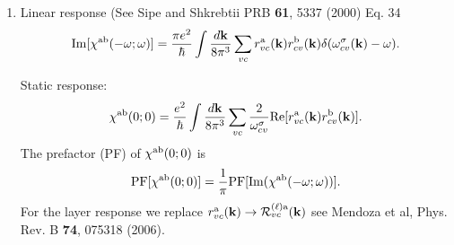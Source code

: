 \documentclass[12pt]{article}
\numberwithin{equation}{section}
\begin{document}
\begin{enumerate}

\item Linear response (See Sipe and Shkrebtii PRB {\bf 61}, 5337 (2000) Eq. 34 \cite{sipePRB00}
\begin{equation}\label{chif}
\mathrm{Im}[\chi^{\mathrm{a}\mathrm{b}}(-\omega;\omega)]
=\frac{\pi e^2}{\hbar}
\int \frac{d\mathbf{k}}{8\pi^3}
\sum_{vc} 
r^{\mathrm{a}}_{vc}(\mathbf{k})r^{\mathrm{b}}_{cv}(\mathbf{k})\delta(\omega^\sigma_{cv}(\mathbf{k})-\omega)  
.  
\end{equation}  

Static response:
\begin{equation*}\label{chif0}
\chi^{\mathrm{a}\mathrm{b}}(0;0)=\frac{e^2}{\hbar}
\int \frac{d\mathbf{k}}{8\pi^3}
\sum_{vc}\frac{2}{\omega^\sigma_{cv}}
\mathrm{Re}[r^{\mathrm{a}}_{vc}(\mathbf{k})r^{\mathrm{b}}_{cv}(\mathbf{k})]
. 
\end{equation*} 
The prefactor (PF) of $\chi^{\mathrm{a}\mathrm{b}}(0;0)$ is
\begin{align}\label{mcv1}
\mathrm{PF}[\chi^{\mathrm{a}\mathrm{b}}(0;0)]=\frac{1}{\pi}
\mathrm{PF[Im}(\chi^{\mathrm{a}\mathrm{b}}(-\omega;\omega))]
.
\end{align}
For the layer response we replace $r^{\mathrm{a}}_{vc}(\mathbf{k})\to{\cal 
 R}^{(\ell)\mathrm{a}}_{vc}(\mathbf{k})$ see Mendoza et al, Phys. Rev. B {\bf 74},
075318 (2006). 


\end{enumerate}
\end{document}
